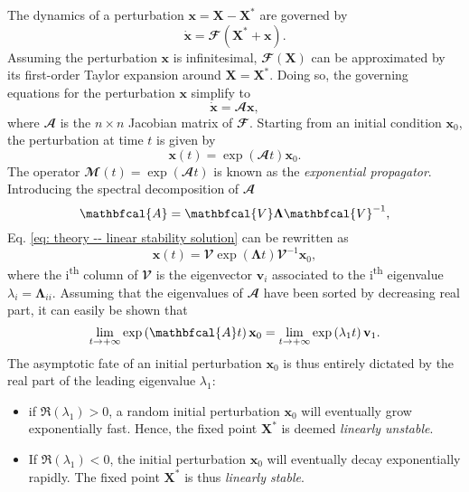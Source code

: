   The dynamics of a perturbation $\mathbf{x} = \mathbf{X} - \mathbf{X}^*$ are governed by
  \begin{equation}
    \dot{\mathbf{x}} = \mathbfcal{F}(\mathbf{X}^* + \mathbf{x}).
  \end{equation}
  Assuming the perturbation $\mathbf{x}$ is infinitesimal, $\mathbfcal{F}(\mathbf{X})$ can be approximated by its first-order Taylor expansion around $\mathbf{X} = \mathbf{X}^*$. Doing so, the governing equations for the perturbation $\mathbf{x}$ simplify to
  \begin{equation}
    \dot{\mathbf{x}} = \mathbfcal{A}\mathbf{x},
    \label{eq: theory -- linear perturbation dynamics}
  \end{equation}
  where $\mathbfcal{A}$ is the $n \times n$ Jacobian matrix of $\mathbfcal{F}$. Starting from an initial condition $\mathbf{x}_0$, the perturbation at time $t$ is given by
  \begin{equation}
    \mathbf{x}(t) = \exp \left( \mathbfcal{A}t \right) \mathbf{x}_0.
    \label{eq: theory -- linear stability solution}
  \end{equation}
  The operator $\mathbfcal{M}(t) = \exp \left( \mathbfcal{A}t \right)$ is known as the \emph{exponential propagator}. Introducing the spectral decomposition of $\mathbfcal{A}$
  \begin{equation}
    \mathbfcal{A} = \mathbfcal{V} \boldsymbol{\Lambda} \mathbfcal{V}^{-1},
    \notag
  \end{equation}
  Eq. \eqref{eq: theory -- linear stability solution} can be rewritten as
  \begin{equation}
    \mathbf{x}(t) = \mathbfcal{V} \exp \left( \boldsymbol{\Lambda} t \right) \mathbfcal{V}^{-1} \mathbf{x}_0,
  \end{equation}
  where the i\textsuperscript{th} column of $\mathbfcal{V}$ is the eigenvector $\mathbf{v}_i$ associated to the i\textsuperscript{th} eigenvalue $\lambda_i = \boldsymbol{\Lambda}_{ii}$. Assuming that the eigenvalues of $\mathbfcal{A}$ have been sorted by decreasing real part, it can easily be shown that
  \begin{equation}
    \lim\limits_{t \to + \infty} \exp \left( \mathbfcal{A} t \right) \mathbf{x}_0 = \lim \limits_{t \to + \infty} \exp \left( \lambda_1 t \right) \mathbf{v}_1 .
    \notag
  \end{equation}
  The asymptotic fate of an initial perturbation $\mathbf{x}_0$ is thus entirely dictated by the real part of the leading eigenvalue $\lambda_1$:
  \begin{itemize}
    \item if $\Re \left( \lambda_1 \right) > 0$, a random initial perturbation $\mathbf{x}_0$ will eventually grow exponentially fast. Hence, the fixed point $\mathbf{X}^*$ is deemed \emph{linearly unstable}.

    \item If $\Re \left( \lambda_1 \right) < 0$, the initial perturbation $\mathbf{x}_0$ will eventually decay exponentially rapidly. The fixed point $\mathbf{X}^*$ is thus \emph{linearly stable}.
  \end{itemize}
